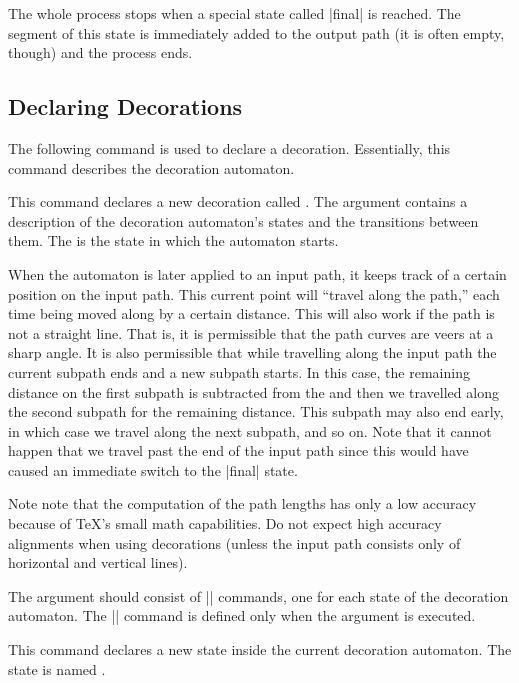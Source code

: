 The whole process stops when a special state called |final| is
reached. The segment of this state is immediately added to the output
path (it is often empty, though) and the process ends.




\subsection{Declaring Decorations}

The following command is used to declare a decoration. Essentially,
this command describes the decoration automaton.


\begin{command}{\pgfdeclaredecoration{}}
  This command declares a new decoration called . The
   argument contains a description of the decoration
  automaton's states and the transitions between them. The
   is the state in which the automaton starts.

  When the automaton is later applied to an input path, it keeps track
  of a certain position on the input path. This current point
  will ``travel along the path,'' each time being moved along by a
  certain distance. This will also work if the path is not a straight
  line. That is, it is permissible that the path curves are veers at a
  sharp angle.  It is also permissible that while travelling along the
  input path the current subpath ends and a new subpath starts. In this
  case, the remaining distance on the first subpath is subtracted
  from the  and then we travelled along the second
  subpath for the remaining distance. This subpath may also end
  early, in which case we travel along the next subpath, and so
  on. Note that it cannot happen that we travel past the end of the
  input path since this would have caused an immediate switch to
  the |final| state.

  Note note that the computation of the path lengths has only a low
  accuracy because of \TeX's small math capabilities. Do not
  expect high accuracy alignments when using decorations (unless the
  input path consists only of horizontal and vertical lines).

  The  argument should consist of |\state| commands, one
  for each state of the decoration automaton. The |\state| command is
  defined only when the  argument is executed.

  \begin{command}{\state{}}
    This command declares a new state inside the current decoration
    automaton. The state is named .
    

\end{command}
\end{command}
